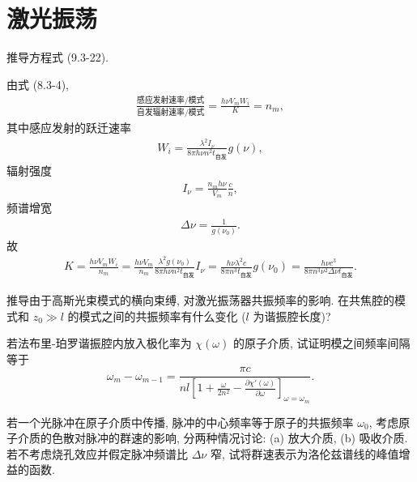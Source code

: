 \documentclass{note}
\begin{document}
\fi
\setcounter{chapter}{8}
\chapter{激光振荡}
\begin{exe}
    推导方程式 (9.3-22).
\end{exe}
\begin{pf}
    由式 (8.3-4),
    \begin{align}
        \frac{\text{感应发射速率}/\text{模式}}{\text{自发辐射速率}/\text{模式}}=\frac{h\nu V_mW_i}{K}=n_m,
    \end{align}
    其中感应发射的跃迁速率
    \begin{align}
        W_i=\frac{\lambda^2I_{\nu}}{8\pi h\nu n^2t_{\text{自发}}}g(\nu),
    \end{align}
    辐射强度
    \begin{align}
        I_{\nu}=\frac{n_mh\nu}{V_m}\frac{c}{n},
    \end{align}
    频谱增宽
    \begin{align}
        \Delta\nu=\frac{1}{g(\nu_0)}.
    \end{align}
    故
    \begin{align}
        K=\frac{h\nu V_mW_i}{n_m}=\frac{h\nu V_m}{n_m}\frac{\lambda^2g(\nu_0)}{8\pi h\nu n^2t_{\text{自发}}}I_{\nu}=\frac{h\nu\lambda^2c}{8\pi n^3t_{\text{自发}}}g(\nu_0)=\frac{h\nu c^3}{8\pi n^3\nu^2\Delta\nu t_{\text{自发}}}.
    \end{align}
\end{pf}

\begin{exe}
    推导由于高斯光束模式的横向束缚, 对激光振荡器共振频率的影响. 在共焦腔的模式和 $z_0\gg l$ 的模式之间的共振频率有什么变化 ($l$ 为谐振腔长度)?
\end{exe}
\begin{pf}
    
\end{pf}

\begin{exe}
    若法布里-珀罗谐振腔内放入极化率为 $\chi(\omega)$ 的原子介质, 试证明模之间频率间隔等于
    \[
        \omega_m-\omega_{m-1}=\frac{\pi c}{nl\left[1+\frac{\omega}{2n^2}-\frac{\partial\chi'(\omega)}{\partial\omega}\right]_{\omega=\omega_m}}.
    \]
\end{exe}
\begin{pf}
    
\end{pf}

\begin{exe}
    若一个光脉冲在原子介质中传播, 脉冲的中心频率等于原子的共振频率 $\omega_0$, 考虑原子介质的色散对脉冲的群速的影响, 分两种情况讨论: (a) 放大介质, (b) 吸收介质. 若不考虑烧孔效应并假定脉冲频谱比 $\Delta\nu$ 窄, 试将群速表示为洛伦兹谱线的峰值增益的函数.
\end{exe}
\begin{sol}

\end{sol}
\end{document}
